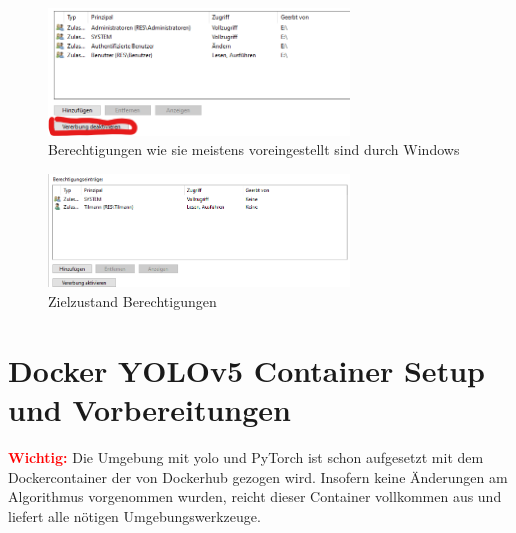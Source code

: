 \begin{figure}
    \centering
    \includegraphics[width=8cm]{data/img/berechtigungen_1.png}
    \caption{Berechtigungen wie sie meistens voreingestellt sind durch Windows}
    \label{fig:berecht_1}
\end{figure}
\begin{figure}
    \centering
    \includegraphics[width=8cm]{data/img/berechtigungen_2.png}
    \caption{Zielzustand Berechtigungen}
    \label{fig:berecht_2}
\end{figure}



\section{Docker YOLOv5 Container Setup und Vorbereitungen}

\textcolor{red}{\textbf{Wichtig:}} Die Umgebung mit \ac{yolo} und PyTorch ist schon aufgesetzt mit dem Dockercontainer der von Dockerhub gezogen wird. Insofern keine Änderungen am Algorithmus vorgenommen wurden, reicht dieser Container vollkommen aus und liefert alle nötigen Umgebungswerkzeuge.


